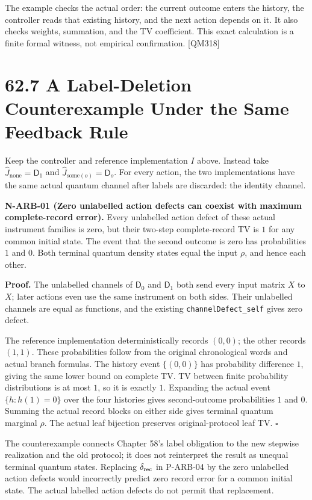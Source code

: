 \documentclass[
  11pt,
  oneside]{book}
\begin{document}
The example checks the actual order: the current outcome enters the
history, the controller reads that existing history, and the next action
depends on it. It also checks weights, summation, and the TV
coefficient. This exact calculation is a finite formal witness, not
empirical confirmation. {[}QM318{]}

\section{62.7 A Label-Deletion Counterexample Under the Same Feedback
Rule}

Keep the controller and reference implementation \(I\) above. Instead
take \(\widehat J_{\mathrm{none}}=\mathsf D_1\) and
\(\widehat J_{\mathrm{some}(o)}=\mathsf D_o\). For every action, the two
implementations have the same actual quantum channel after labels are
discarded: the identity channel.

\label{n-arb-01}{}

\textbf{N-ARB-01 (Zero unlabelled action defects can coexist with
maximum complete-record error).} Every unlabelled action defect of these
actual instrument families is zero, but their two-step complete-record
TV is \(1\) for any common initial state. The event that the second
outcome is zero has probabilities \(1\) and \(0\). Both terminal quantum
density states equal the input \(\rho\), and hence each other.

\textbf{Proof.} The unlabelled channels of \(\mathsf D_0\) and
\(\mathsf D_1\) both send every input matrix \(X\) to \(X\); later
actions even use the same instrument on both sides. Their unlabelled
channels are equal as functions, and the existing
\texttt{channel\allowbreak Defect\_\allowbreak self} gives zero defect.

The reference implementation deterministically records \((0,0)\); the
other records \((1,1)\). These probabilities follow from the original
chronological words and actual branch formulas. The history event
\(\{(0,0)\}\) has probability difference \(1\), giving the same lower
bound on complete TV. TV between finite probability distributions is at
most \(1\), so it is exactly \(1\). Expanding the actual event
\(\{h:h(1)=0\}\) over the four histories gives second-outcome
probabilities \(1\) and \(0\). Summing the actual record blocks on
either side gives terminal quantum marginal \(\rho\). The actual leaf
bijection preserves original-protocol leaf TV. \(\square\)

The counterexample connects Chapter 58's label obligation to the new
stepwise realization and the old protocol; it does not reinterpret the
result as unequal terminal quantum states. Replacing
\(\delta_{\rm rec}\) in P-ARB-04 by the zero unlabelled action defects
would incorrectly predict zero record error for a common initial state.
The actual labelled action defects do not permit that replacement.
\end{document}
